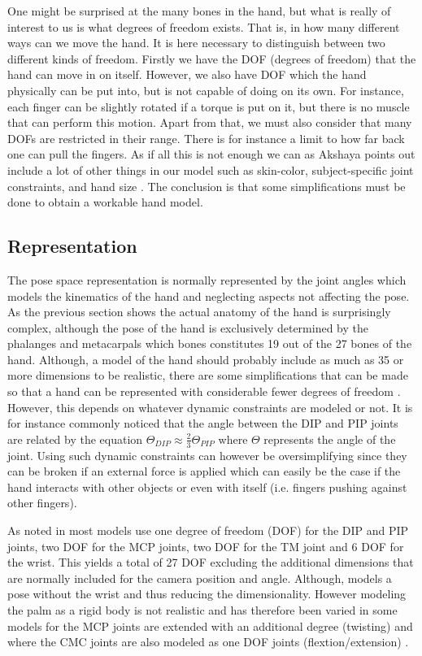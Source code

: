 \documentclass[a4paper,11pt]{kth-mag}
\begin{document}
One might be surprised at the many bones in the hand, but what is really  of interest to us is what degrees of freedom exists.
That is, in how many different ways can we move the hand.
It is here necessary to distinguish between two different kinds of freedom.
Firstly we have the DOF (degrees of freedom) that the hand can move in on itself.
However, we also have DOF which the hand physically can be put into, but is not capable of doing on its own.
For instance, each finger can be slightly rotated if a torque is put on it, but there is no muscle that can perform this motion.
Apart from that, we must also consider that many DOFs are restricted in their range.
There is for instance a limit to how far back one can pull the fingers.
As if all this is not enough we can as Akshaya points out include a lot of other things in our model such as skin-color, subject-specific joint constraints, and hand size \cite{akshayaMaster}.
The conclusion is that some simplifications must be done to obtain a workable hand model.

\subsection{Representation}
The pose space representation is normally represented by the joint angles which models the kinematics of the hand and neglecting aspects not affecting the pose.
As the previous section shows the actual anatomy of the hand is surprisingly complex, although the pose of the hand is exclusively determined by the phalanges and metacarpals which bones constitutes 19 out of the 27 bones of the hand.
Although, a model of the hand should probably include as much as 35 or more dimensions to be realistic\cite{akshayaPaper}, there are some simplifications that can be made so that a hand can be represented with considerable fewer degrees of freedom \cite{review}.
However, this depends on whatever dynamic constraints are modeled or not.
It is for instance commonly noticed that the angle between the DIP and PIP joints are related by the equation $\Theta_{DIP} \approx \frac{2}{3}\Theta_{PIP}$ where $\Theta$ represents the angle of the joint\cite{review}.
Using such dynamic constraints can however be oversimplifying since they can be broken if an external force is applied which can easily be the case if the hand interacts with other objects or even with itself (i.e. fingers pushing against other fingers).

As noted in \cite{review} most models use one degree of freedom (DOF) for the DIP and PIP joints, two DOF for the MCP joints, two DOF for the TM joint and 6 DOF for the wrist. 
This yields a total of 27 DOF excluding the additional dimensions that are normally included for the camera position and angle.
Although, \cite{clutter} models a pose without the wrist and thus reducing the dimensionality.
However modeling the palm as a rigid body is not realistic and has therefore been varied in some models for the MCP joints are extended with an additional degree (twisting) and where the CMC joints are also modeled as one DOF joints (flextion/extension) \cite{review}.
\end{document}
